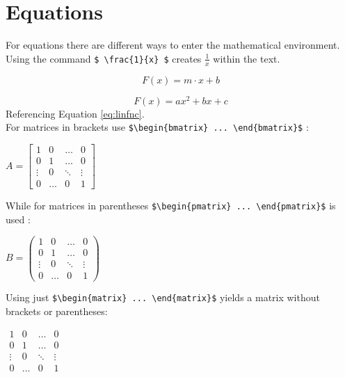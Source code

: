 \documentclass[a4paper, 11pt]{scrreprt}
\begin{document}
\chapter{Equations}
For equations there are different ways to enter the mathematical environment. Using the command \verb+$ \frac{1}{x} $+ creates $ \frac{1}{x} $ within the text.

\begin{equation}\label{eq:linfnc}
F(x) = m \cdot x + b
\end{equation}

\begin{equation*}
F(x) = ax^{2}+bx+c
\end{equation*}
\noindent
Referencing Equation \ref{eq:linfnc}.\\
\newline
For matrices in brackets use \verb+$\begin{bmatrix} ... \end{bmatrix}$+ :
\begin{center}
$A=\begin{bmatrix}
1	& 0	& \dots	 & 0      \\
0	& 1 	& \dots  & 0 	  \\
\vdots	& 0 	& \ddots & \vdots \\
0 	& \dots & 0	 & 1
\end{bmatrix}$
\end{center}
\noindent
While for matrices in parentheses \verb+$\begin{pmatrix} ... \end{pmatrix}$+ is used :
\begin{center}
$B=\begin{pmatrix}
1	& 0	& \dots	 & 0      \\
0	& 1 	& \dots  & 0 	  \\
\vdots	& 0 	& \ddots & \vdots \\
0 	& \dots & 0	 & 1
\end{pmatrix}$
\end{center}
\noindent 
Using just \verb+$\begin{matrix} ... \end{matrix}$+ yields a matrix without brackets or parentheses:
\begin{center}
$\begin{matrix}
1	& 0	& \dots	 & 0      \\
0	& 1 	& \dots  & 0 	  \\
\vdots	& 0 	& \ddots & \vdots \\
0 	& \dots & 0	 & 1
\end{matrix}$
\end{center}
\end{document}
